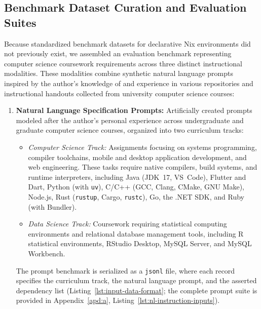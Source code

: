 \subsection{Benchmark Dataset Curation and Evaluation Suites}
\label{subsec:dataset-curation}

Because standardized benchmark datasets for declarative Nix environments did not previously
exist, we assembled an evaluation benchmark representing computer science
coursework requirements across three distinct instructional modalities. These modalities
combine synthetic natural language prompts inspired by the author's knowledge of and
experience in various repositories and instructional handouts collected from university
computer science courses:

\begin{enumerate}
	\item \textbf{Natural Language Specification Prompts:} Artificially created
	      prompts modeled after the author's personal experience across
	      undergraduate and graduate computer science courses, organized into two curriculum
	      tracks:
	      \begin{itemize}
		      \item \emph{Computer Science Track:} Assignments focusing on systems
		            programming, compiler toolchains, mobile and desktop application
		            development, and web engineering. These tasks require native
		            compilers, build systems, and runtime interpreters, including Java
		            (JDK~17, VS~Code), Flutter and Dart, Python (with \texttt{uv}),
		            C/C++ (GCC, Clang, CMake, GNU Make), Node.js, Rust (\texttt{rustup},
		            Cargo, \texttt{rustc}), Go, the .NET SDK, and Ruby (with Bundler).

		      \item \emph{Data Science Track:} Coursework requiring statistical
		            computing environments and relational database management tools, including
		            R statistical environments, RStudio Desktop, MySQL Server, and
		            MySQL Workbench.
	      \end{itemize}
	      The prompt benchmark is serialized as a \texttt{jsonl} file, where each
	      record specifies the curriculum track, the natural language prompt, and
	      the asserted dependency list (Listing~\ref{lst:input-data-format}; the
	      complete prompt suite is provided in Appendix~\ref{apd:a},
	      Listing~\ref{lst:nl-instruction-inputs}).


\end{enumerate}
